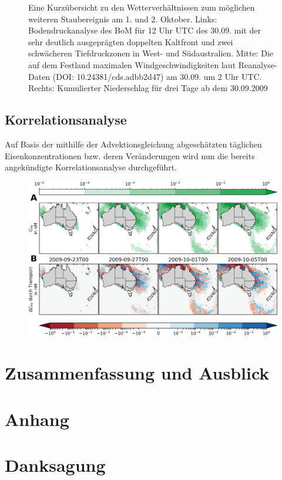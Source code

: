 \documentclass[12pt,a4paper,onecolumn]{scrartcl}
\begin{document}
\begin{figure}
\begin{minipage}[c]{0.33\textwidth}
	\end{minipage}\hfill
	\caption{Eine Kurzübersicht zu den Wetterverhältnissen zum möglichen weiteren Staubereignis am 1. und 2. Oktober. Links: Bodendruckanalyse des BoM für 12 Uhr UTC des 30.09. mit der sehr deutlich ausgeprägten doppelten Kaltfront und zwei schwächeren Tiefdruckzonen in West- und Südaustralien. Mitte: Die auf dem Festland maximalen Windgeschwindigkeiten laut Reanalyse-Daten (DOI: 10.24381/cds.adbb2d47) am 30.09. um 2 Uhr UTC. Rechts: Kumulierter Niederschlag für drei Tage ab dem 30.09.2009} \label{fig:october_weather}
\end{figure}
\subsection{Korrelationsanalyse} \label{sec:correlation_analysis}
Auf Basis der mithilfe der Advektionsgleichung abgeschätzten täglichen Eisenkonzentrationen bzw. deren Veränderungen wird nun die bereits angekündigte Korrelationsanalyse durchgeführt.
\begin{figure}
\includegraphics[width=\textwidth]{bilder/iron_transport.png}
\caption{} \label{fig:iron_transport}
\end{figure}
\section{Zusammenfassung und Ausblick}
\newpage
\printbibliography
\appendix
\section{Anhang}

\section{Danksagung}
\nocite{*}
\end{document}
